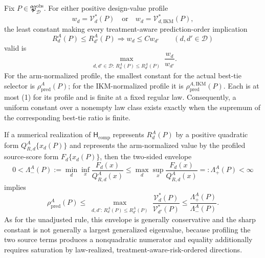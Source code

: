 Fix \(P\in\mathfrak P_{\mathcal D}^{\mathrm{obs}}\). For either positive design-value profile
\[
 w_d=\mathcal V_d^*(P)
 \quad\text{or}\quad
 w_d=\mathcal V_{d,\mathrm{IKM}}^*(P),
\]
the least constant making every treatment-aware prediction-order implication
\[
 R_d^A(P)\le R_{d'}^A(P)\Longrightarrow w_d\le Cw_{d'}
 \qquad(d,d'\in\mathcal D)
\]
valid is
\[
 \max_{\substack{d,d'\in\mathcal D:\,R_d^A(P)\le R_{d'}^A(P)}}
 \frac{w_d}{w_{d'}}. \tag{1}
\]
For the arm-normalized profile, the smallest constant for the actual best-tie selector is \(\rho_{\mathrm{pred}}^A(P)\); for the IKM-normalized profile it is \(\rho_{\mathrm{pred}}^{A,\mathrm{IKM}}(P)\). Each is at most (1) for its profile and is finite at a fixed regular law. Consequently, a uniform constant over a nonempty law class exists exactly when the supremum of the corresponding best-tie ratio is finite.

If a numerical realization of \(\mathsf H_{\mathrm{comp}}\) represents \(R_d^A(P)\) by a positive quadratic form \(Q_{R,d}^A\{x_d(P)\}\) and represents the arm-normalized value by the profiled source-score form \(F_d\{x_d(P)\}\), then the two-sided envelope
\[
 0<\Lambda_-^A(P):=\min_d\inf_x\frac{F_d(x)}{Q_{R,d}^A(x)}
 \le
 \max_d\sup_x\frac{F_d(x)}{Q_{R,d}^A(x)}=:\Lambda_+^A(P)<\infty
\]
implies
\[
 \rho_{\mathrm{pred}}^A(P)
 \le\max_{\substack{d,d':\,R_d^A(P)\le R_{d'}^A(P)}}
 \frac{\mathcal V_d^*(P)}{\mathcal V_{d'}^*(P)}
 \le\frac{\Lambda_+^A(P)}{\Lambda_-^A(P)}. \tag{2}
\]
As for the unadjusted rule, this envelope is generally conservative and the sharp constant is not generally a largest generalized eigenvalue, because profiling the two source terms produces a nonquadratic numerator and equality additionally requires saturation by law-realized, treatment-aware-risk-ordered directions.